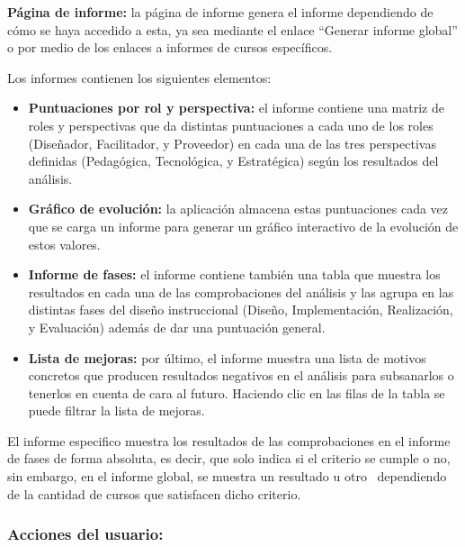 \textbf{Página de informe:} la página de informe genera el informe
dependiendo de cómo se haya accedido a esta, ya sea mediante el enlace
``Generar informe global'' o por medio de los enlaces a informes de cursos
específicos.~

Los informes contienen los siguientes elementos:

\begin{itemize}
	\item
	\textbf{Puntuaciones por rol y perspectiva:} el informe contiene una
	matriz de roles y perspectivas que da distintas puntuaciones a cada
	uno de los roles (Diseñador, Facilitador, y Proveedor) en cada una de
	las tres perspectivas definidas (Pedagógica, Tecnológica, y
	Estratégica) según los resultados del análisis.
	\item
	\textbf{Gráfico de evolución:} la aplicación almacena estas puntuaciones cada vez que se carga un informe para generar un gráfico interactivo de la evolución de estos valores.
	\item
	\textbf{Informe de fases:} el informe contiene también una tabla que
	muestra los resultados en cada una de las comprobaciones del análisis y
	las agrupa en las distintas fases del diseño instruccional (Diseño,
	Implementación, Realización, y Evaluación) además de dar una
	puntuación general.
	\item
	\textbf{Lista de mejoras:} por último, el informe muestra una lista de
	motivos concretos que producen resultados negativos en el análisis
	para subsanarlos o tenerlos en cuenta de cara al futuro. Haciendo clic en las filas de la tabla se puede filtrar la lista de mejoras.
\end{itemize}

El informe especifico muestra los resultados de las comprobaciones en el
informe de fases de forma absoluta, es decir, que solo indica si el
criterio se cumple o no, sin embargo, en el informe global, se muestra
un resultado u otro ~dependiendo de la cantidad de cursos que satisfacen
dicho criterio.


\subsubsection{Acciones del usuario:}

